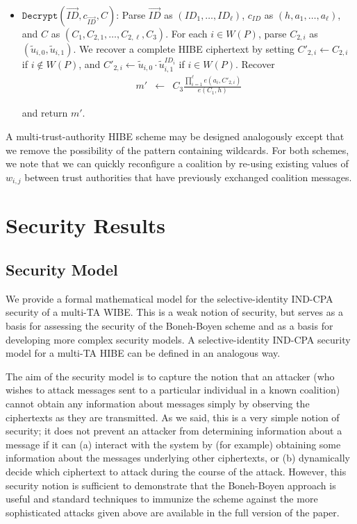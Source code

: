 \documentclass{IEEEtran}
\newcommand{\ID}{\mathit{ID}}
\begin{document}
\begin{itemize}
\item $\texttt{Decrypt}(\vec{\ID},c_{\vec{\ID}},C)$: Parse $\vec{\ID}$
as $(\ID_{1},\ldots,\ID_{\ell})$, $c_{\ID}$ as
$(h,a_{1},\ldots,a_{\ell})$, and $C$ as
$(C_{1},C_{2,1},\ldots,C_{2,\ell},C_{3})$. For each $i\in W(P)$,
parse $C_{2,i}$ as $(\tilde{u}_{i,0},\tilde{u}_{i,1})$. We
recover a complete HIBE ciphertext by setting $C'_{2,i} \gets
C_{2,i}$ if $i\notin W(P)$, and $C'_{2,i}\gets \tilde{u}_{i,0}
\cdot \tilde{u}_{i,1}^{\ID_{i}}$ if $i\in W(P)$. Recover
\begin{eqnarray*}
    m' & \gets & C_{3} \frac{\prod_{i=1}^{\ell} e(a_{i},C'_{2,i})}{e(C_{1},h)}
\end{eqnarray*}

and return $m'$.
\end{itemize}

A multi-trust-authority HIBE scheme may be designed analogously
except that we remove the possibility of the pattern containing
wildcards. For both schemes, we note that we can quickly reconfigure
a coalition by re-using existing values of $w_{i,j}$ between trust
authorities that have previously exchanged coalition messages.

\section{Security Results}

\subsection{Security Model}

We provide a formal mathematical model for the selective-identity
IND-CPA security of a multi-TA WIBE. This is a weak notion of
security, but serves as a basis for assessing the security of the
Boneh-Boyen scheme and as a basis for developing more complex
security models. A selective-identity IND-CPA security model for a
multi-TA HIBE can be defined in an analogous way.

The aim of the security model is to capture the notion that an
attacker (who wishes to attack messages sent to a particular
individual in a known coalition) cannot obtain any information about
messages simply by observing the ciphertexts as they are
transmitted. As we said, this is a very simple notion of security;
it does not prevent an attacker from determining information about a
message if it can (a) interact with the system by (for example)
obtaining some information about the messages underlying other
ciphertexts, or (b) dynamically decide which ciphertext to attack
during the course of the attack. However, this security notion is
sufficient to demonstrate that the Boneh-Boyen approach is useful
and standard techniques to immunize the scheme against the more
sophisticated attacks given above are available in the full version
of the paper.
\end{document}
